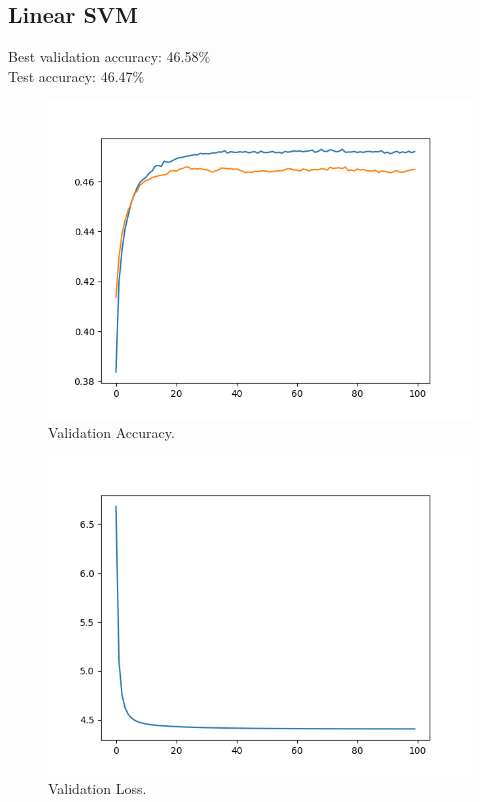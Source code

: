 \documentclass[12pt, letter]{article}
\begin{document}
{\subsection{Linear SVM}
Best validation accuracy: 46.58\% \\
Test accuracy: 46.47\% \\
\begin{figure}[h]
  \centering
  \includegraphics[scale=0.60]{hog_svm_accuracy}
  \caption{Validation Accuracy.}
  \label{fig:eg}
\end{figure}
\begin{figure}[h]
  \centering
  \includegraphics[scale=0.60]{hog_svm_loss}
  \caption{Validation Loss.}
  \label{fig:eg}
\end{figure}

}
\end{document}

